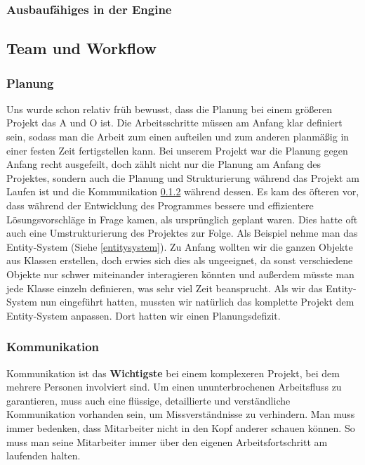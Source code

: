 \subsubsection{Ausbaufähiges in der Engine}

\subsection{Team und Workflow}
\subsubsection{Planung}
Uns wurde schon relativ früh bewusst, dass die Planung bei einem größeren Projekt das A und O ist. Die Arbeitsschritte müssen am Anfang klar definiert sein, sodass man die Arbeit zum einen aufteilen und zum anderen planmäßig in einer festen Zeit fertigstellen kann.
Bei unserem Projekt war die Planung gegen Anfang recht ausgefeilt, doch zählt nicht nur die Planung am Anfang des Projektes, sondern auch die Planung und Strukturierung während das Projekt am Laufen ist und die Kommunikation \ref{kommunikation} während dessen. Es kam des öfteren vor, dass während der Entwicklung des Programmes bessere und effizientere Lösungsvorschläge in Frage kamen, als ursprünglich geplant waren. Dies hatte oft auch eine Umstrukturierung des Projektes zur Folge. Als Beispiel nehme man das Entity-System (Siehe \cref{entitysystem}). Zu Anfang wollten wir die ganzen Objekte aus Klassen erstellen, doch erwies sich dies als ungeeignet, da sonst verschiedene Objekte nur schwer miteinander interagieren könnten und außerdem müsste man jede Klasse einzeln definieren, was sehr viel Zeit beansprucht. 
Als wir das Entity-System nun eingeführt hatten, mussten wir natürlich das komplette Projekt dem Entity-System anpassen. Dort hatten wir einen Planungsdefizit.                                                   
\subsubsection{Kommunikation}
\label{kommunikation}
Kommunikation ist das \textbf{Wichtigste} bei einem komplexeren Projekt, bei dem mehrere Personen involviert sind. Um einen ununterbrochenen Arbeitsfluss zu garantieren, muss auch eine flüssige, detaillierte und verständliche Kommunikation vorhanden sein, um Missverständnisse zu verhindern. Man muss immer bedenken, dass Mitarbeiter nicht in den Kopf anderer schauen können. So muss man seine Mitarbeiter immer über den eigenen Arbeitsfortschritt am laufenden halten.

